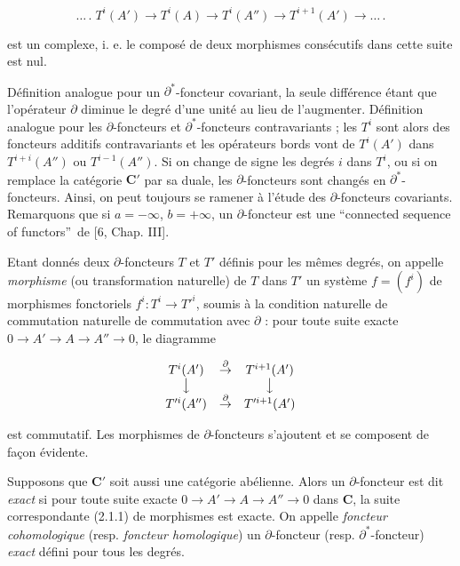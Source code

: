 
\noindent
\[
\tag{2.1.1.}
\ldots\,.\;T^i(A')\to T^i(A)
\to T^i(A'')\to T^{i+1}(A')
\to\ldots\,.
\]

\noindent est un complexe, i. e. le composé de deux morphismes consécutifs
dans cette suite est nul.

Définition analogue pour un $\partial^*$-foncteur covariant, la seule
différence étant que l'opérateur $\partial$ diminue le degré d'une unité au
lieu de l'augmenter. Définition analogue pour les $\partial$-foncteurs et
$\partial^*$-foncteurs contravariants ; les $T^i$ sont alors des foncteurs
additifs contravariants et les opérateurs bords vont de $T^i(A')$ dans
$T^{i+i}(A'')$ ou $T^{i-1}(A'')$. Si on change de signe les degrés $i$ dans
$T^i$, ou si on remplace la catégorie $\mathbf{C}'$ par sa duale, les
$\partial$-foncteurs sont changés en $\partial^*$-foncteurs. Ainsi, on peut
toujours se ramener à l'étude des $\partial$-foncteurs covariants. Remarquons
que si $a=-\infty$, $b=+\infty$, un $\partial$-foncteur est une
\textquotedblleft connected sequence of functors\textquotedblright\ de [6,
Chap. III].

Etant donnés deux $\partial$-foncteurs $T$ et $T'$ définis pour les mêmes
degrés, on appelle \textit{morphisme} (ou transformation naturelle) de $T$
dans $T'$ un système $f=(f^i)$ de morphismes fonctoriels
$f^i:T^i\to T'^i$, soumis à la condition naturelle de commutation
naturelle de commutation avec $\partial$ : pour toute suite exacte
$0\to A'\to A\to A''\to 0$,
le diagramme

\[
\begin{array}{ccc}
T^i(A') & \mathop{\to}\limits^{\partial} & T^{i+1}(A')\\
\big\downarrow && \big\downarrow\\
T'^i(A'') & \mathop{\to}\limits^{\partial} & T'^{i+1}(A')
\end{array}
\]

\noindent est commutatif. Les morphismes de $\partial$-foncteurs s'ajoutent
et se composent de façon évidente.

Supposons que $\mathbf{C}'$ soit aussi une catégorie abélienne. Alors un
$\partial$-foncteur est dit \textit{exact} si pour toute suite exacte
$0\to A'\to A\to A''\to 0$
dans $\mathbf{C}$, la suite correspondante (2.1.1) de morphismes est exacte. On appelle
\textit{foncteur cohomologique} (resp. \textit{foncteur homologique}) un
$\partial$-foncteur (resp. $\partial^*$-foncteur) \textit{exact} défini pour tous les
degrés.

